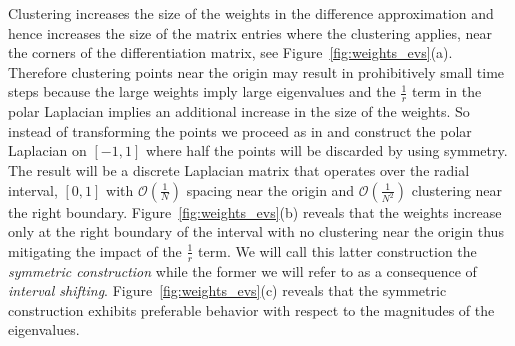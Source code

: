 \documentclass[12pt]{article}
\begin{document}
Clustering increases the size of the weights in the difference approximation and hence increases the size of the matrix entries where the clustering applies, near the corners of the differentiation matrix, see Figure~\ref{fig:weights_evs}(a). Therefore clustering points near the origin may result in prohibitively small time steps because the large weights imply large eigenvalues and the $\frac{1}{r}$ term in the polar Laplacian implies an additional increase in the size of the weights. So instead of transforming the points we proceed as in \cite{FornbergPSPolar, FornbergText,TrefethenMATLAB} and construct the polar Laplacian on $[-1,1]$ where half the points will be discarded by using symmetry. The result will be a discrete Laplacian matrix that operates over the radial interval, $[0,1]$ with $\mathcal{O}(\frac{1}{N})$ spacing near the origin and $\mathcal{O}(\frac{1}{N^2})$ clustering near the right boundary. Figure~\ref{fig:weights_evs}(b) reveals that the weights increase only at the right boundary of the interval with no clustering near the origin thus mitigating the impact of the $\frac{1}{r}$ term. We will call this latter construction the \emph{symmetric construction} while the former we will refer to as a consequence of \emph{interval shifting}. Figure~\ref{fig:weights_evs}(c) reveals that the symmetric construction exhibits preferable behavior with respect to the magnitudes of the eigenvalues.
\end{document}
